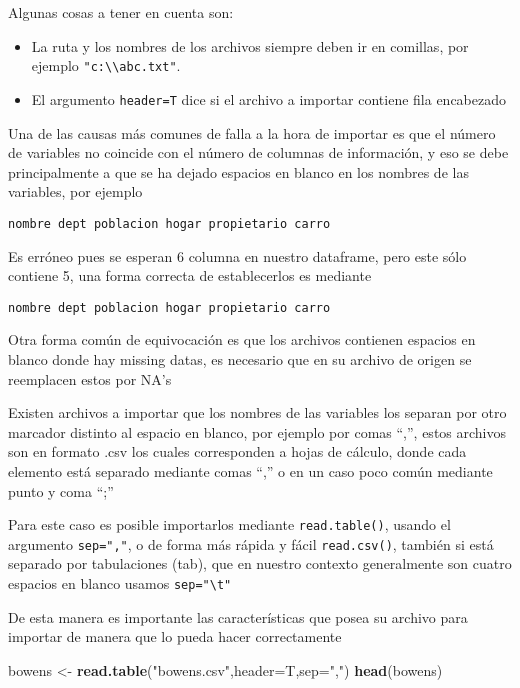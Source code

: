 \documentclass[]{article}
\newenvironment{Shaded}{\begin{snugshade}}{\end{snugshade}}
\newcommand{\KeywordTok}[1]{\textcolor[rgb]{0.13,0.29,0.53}{\textbf{#1}}}
\newcommand{\DataTypeTok}[1]{\textcolor[rgb]{0.13,0.29,0.53}{#1}}
\newcommand{\StringTok}[1]{\textcolor[rgb]{0.31,0.60,0.02}{#1}}
\newcommand{\NormalTok}[1]{#1}
\begin{document}
Algunas cosas a tener en cuenta son:

\begin{itemize}
\item
  La ruta y los nombres de los archivos siempre deben ir en comillas,
  por ejemplo \texttt{"c:\textbackslash{}\textbackslash{}abc.txt"}.
\item
  El argumento \texttt{header=T} dice si el archivo a importar contiene
  fila encabezado
\end{itemize}

Una de las causas más comunes de falla a la hora de importar es que el
número de variables no coincide con el número de columnas de
información, y eso se debe principalmente a que se ha dejado espacios en
blanco en los nombres de las variables, por ejemplo

\begin{verbatim}
nombre dept poblacion hogar propietario carro
\end{verbatim}

Es erróneo pues se esperan 6 columna en nuestro dataframe, pero este
sólo contiene 5, una forma correcta de establecerlos es mediante

\begin{verbatim}
nombre dept poblacion hogar propietario carro
\end{verbatim}

Otra forma común de equivocación es que los archivos contienen espacios
en blanco donde hay missing datas, es necesario que en su archivo de
origen se reemplacen estos por NA's

Existen archivos a importar que los nombres de las variables los separan
por otro marcador distinto al espacio en blanco, por ejemplo por comas
``,'', estos archivos son en formato .csv los cuales corresponden a
hojas de cálculo, donde cada elemento está separado mediante comas ``,''
o en un caso poco común mediante punto y coma ``;''

Para este caso es posible importarlos mediante \texttt{read.table()},
usando el argumento \texttt{sep=","}, o de forma más rápida y fácil
\texttt{read.csv()}, también si está separado por tabulaciones (tab),
que en nuestro contexto generalmente son cuatro espacios en blanco
usamos \texttt{sep="\textbackslash{}t"}

De esta manera es importante las características que posea su archivo
para importar de manera que lo pueda hacer correctamente

\begin{Shaded}
\begin{Highlighting}[]
\NormalTok{bowens <-}\StringTok{ }\KeywordTok{read.table}\NormalTok{(}\StringTok{"bowens.csv"}\NormalTok{,}\DataTypeTok{header=}\NormalTok{T,}\DataTypeTok{sep=}\StringTok{","}\NormalTok{)}
\KeywordTok{head}\NormalTok{(bowens)}
\end{Highlighting}
\end{Shaded}
\end{document}
